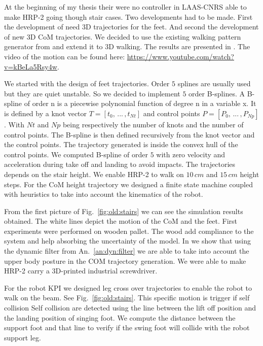 At the beginning of my thesis their were no controller in LAAS-CNRS able to make HRP-2 
going though stair cases.
Two developments had to be made.
First the development of need 3D trajectories for the feet.
And second the development of new 3D CoM trajectories.
We decided to use the existing walking pattern generator from \cite{stasse2009fast} and extend it to 3D walking.
The results are presented in \cite{naveau:ichr:2014}.
The video of the motion can be found here: \url{https://www.youtube.com/watch?v=kBeLa5Rsy4w}.

We started with the design of feet trajectories.
Order $5$ splines are usually used but they are quiet unstable.
So we decided to implement $5$ order B-splines.
A B-spline of order n is a piecewise polynomial function of degree n in a variable x.
It is defined by a knot vector $T=[t_0,\,...\,,t_{Nt}]$ and control points $P=[P_0,\,...\,,P_{Np}]$.
With $Nt$ and $Np$ being respectively the number of knots and the number of control points.
The B-spline is then defined recursively from the knot vector and the control points.
The trajectory generated is inside the convex hull of the control points.
We computed B-spline of order $5$ with zero velocity and acceleration during take off and landing to avoid impacts.
The trajectories depends on the stair height.
We enable HRP-2 to walk on $10\,cm$ and $15\,cm$ height steps. 
For the CoM height trajectory we designed a finite state machine coupled with heuristics to take into account the kinematics of the robot.

From the first picture of Fig.~\ref{fig:old:stairs} we can see the simulation results obtained.
The white lines depict the motion of the CoM and the feet.
First experiments were performed on wooden pallet.
The wood add compliance to the system and help absorbing the uncertainty of the model.
In \cite{naveau:ichr:2014} we show that using the dynamic filter from An.~\ref{an:dyn:filter} we are able to take into account the upper body posture in the COM trajectory generation.
We were able to make HRP-2 carry a 3D-printed industrial screwdriver.

For the robot KPI we designed leg cross over trajectories to enable the robot to walk on the beam.
See Fig.~\ref{fig:old:stairs}.
This specific motion is trigger if self collision
Self collision are detected using the line between the lift off position and the landing position of singing foot.
We compute the distance between the support foot and that line to verify if the swing foot will collide with the robot support leg.

